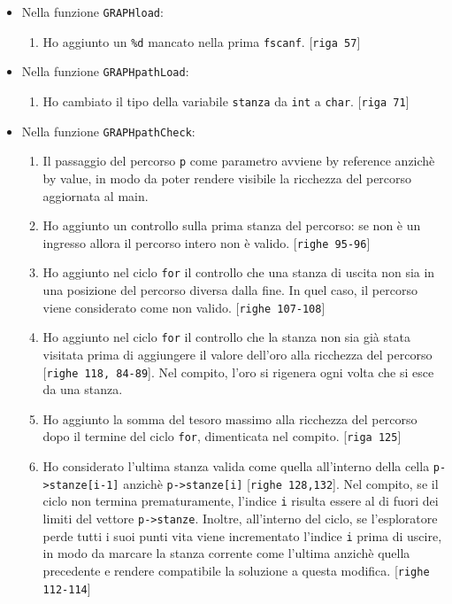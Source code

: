 \documentclass[a4paper]{article}
\newcommand{\code}[1]{\texttt{#1}}
\newcommand{\riga}[1]{[\code{riga #1}]}
\newcommand{\righe}[1]{[\code{righe #1}]}
\begin{document}
    \begin{itemize}
        \item Nella funzione \code{GRAPHload}:
            \begin{enumerate}
                \item Ho aggiunto un \code{\%d} mancato nella prima \code{fscanf}. \riga{57}
            \end{enumerate}
        \item Nella funzione \code{GRAPHpathLoad}:
        \begin{enumerate}
            \item Ho cambiato il tipo della variabile \code{stanza} da \code{int} a \code{char}. \riga{71}
        \end{enumerate}
        \item Nella funzione \code{GRAPHpathCheck}:
            \begin{enumerate}
                \item Il passaggio del percorso \code{p} come parametro avviene by reference anzichè by value, in modo da poter rendere visibile la ricchezza del percorso aggiornata al main.
                \item Ho aggiunto un controllo sulla prima stanza del percorso: se non è un ingresso allora il percorso intero non è valido. \righe{95-96}
                \item Ho aggiunto nel ciclo \code{for} il controllo che una stanza di uscita non sia in una posizione del percorso diversa dalla fine. In quel caso, il percorso viene considerato come non valido. \righe{107-108}
                \item Ho aggiunto nel ciclo \code{for} il controllo che la stanza non sia già stata visitata prima di aggiungere il valore dell'oro alla ricchezza del percorso \righe{118, 84-89}. Nel compito, l'oro si rigenera ogni volta che si esce da una stanza. %
                \item Ho aggiunto la somma del tesoro massimo alla ricchezza del percorso dopo il termine del ciclo \code{for}, dimenticata nel compito. \riga{125}
                \item Ho considerato l'ultima stanza valida come quella all'interno della cella \code{p->stanze[i-1]} anzichè \code{p->stanze[i]} \righe{128,132}. Nel compito, se il ciclo non termina prematuramente, l'indice \code{i} risulta essere al di fuori dei limiti del vettore \code{p->stanze}. Inoltre, all'interno del ciclo, se l'esploratore perde tutti i suoi punti vita viene incrementato l'indice \code{i} prima di uscire, in modo da marcare la stanza corrente come l'ultima anzichè quella precedente e rendere compatibile la soluzione a questa modifica. \righe{112-114}

\end{enumerate}
\end{itemize}
\end{document}
